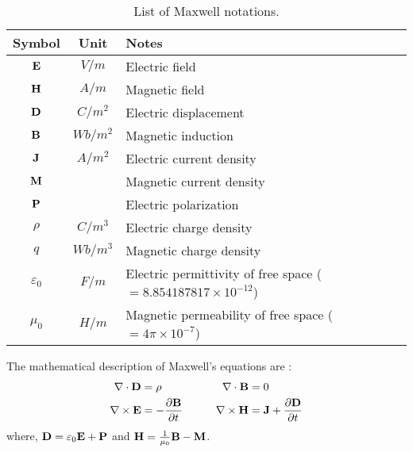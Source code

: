 \begin{table}[!ht]
	\centering
	\caption[List of Maxwell notations]{\label{tab:background:notation2}
		List of Maxwell notations.
	}
	\begin{tabular}{ccl}
		Symbol & Unit & Notes \\
		\hline
		$\mathbf{E}$ & $V/m$      & Electric field \\
		$\mathbf{H}$ & $A/m$      & Magnetic field \\
		$\mathbf{D}$ & $C/m^2$    & Electric displacement \\
		$\mathbf{B}$ & $Wb/m^2$   & Magnetic induction \\
		$\mathbf{J}$ & $A/m^2$    & Electric current density \\
		$\mathbf{M}$ &            & Magnetic current density \\
		$\mathbf{P}$ &            & Electric polarization \\
		$\rho$ & $C/m^3$    & Electric charge density \\
		$q$    & $Wb/m^3$   & Magnetic charge density \\
		$\varepsilon_0$     & $F/m$ & Electric permittivity of free space ($=8.854187817\times10^{-12}$) \\
		$\mu_0$             & $H/m$ & Magnetic permeability of free space ($=4\pi\times10^{-7}$) \\
	\end{tabular}
\end{table}

The mathematical description of Maxwell’s equations are \cite{bohren2008absorption}:
\begin{equation}
	\begin{aligned}
		\nabla\cdot\mathbf{D}  &= \rho & & & & & \nabla\cdot\mathbf{B} &= 0 \\
		\nabla\times\mathbf{E} &= -\frac{\partial\mathbf{B}}{\partial t} & & & & & 
		\nabla\times\mathbf{H} &= \mathbf{J} + \frac{\partial\mathbf{D}}{\partial t}
  \end{aligned}
\end{equation}
where, $\mathbf{D} = \varepsilon_0\mathbf{E} + \mathbf{P}$ and 
	$\mathbf{H} = \frac{1}{\mu_0}\mathbf{B} - \mathbf{M}$.

